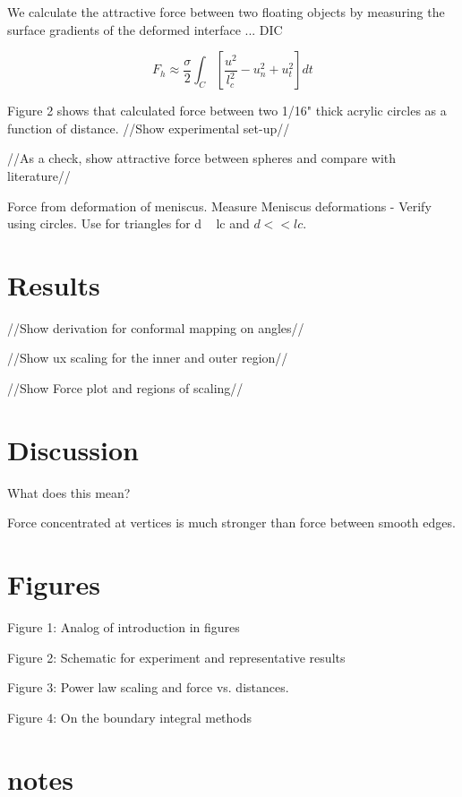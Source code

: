 \documentclass[twocolumn,prl]{revtex4-1}
\begin{document}
We calculate the attractive force between two floating objects by measuring the surface gradients of the deformed interface ... DIC

\begin{equation}
F_h \approx \frac{\sigma}{2} \int _C [\frac{u^2}{l_c^2}- u_n^2 +u_t^2] dt
\end{equation}

Figure 2 shows that calculated force between two 1/16" thick acrylic circles as a function of distance.
//Show experimental set-up//

//As a check, show attractive force between spheres and compare with literature//

Force from deformation of meniscus. Measure Meniscus deformations - Verify using circles. Use for triangles for d ~ lc and $d << lc$.

\section{Results}
//Show derivation for conformal mapping on angles//

//Show ux scaling for the inner and outer region//

//Show Force plot and regions of scaling//

\section{Discussion}
What does this mean?

Force concentrated at vertices is much stronger than force between smooth edges.

\section{Figures}
Figure 1: Analog of introduction in figures

Figure 2: Schematic for experiment and representative results 

Figure 3: Power law scaling and force vs. distances.

Figure 4: On the boundary integral methods

\section{notes}
\end{document}
